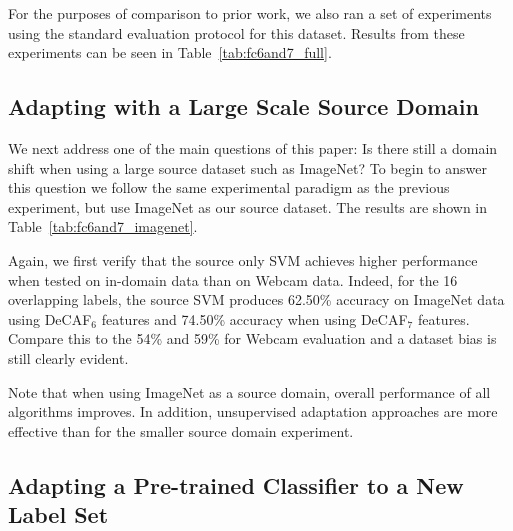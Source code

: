 


For the purposes of comparison to prior work, we also ran a set of experiments
using the standard evaluation protocol for this dataset.  Results from these experiments can be seen in
Table~\ref{tab:fc6and7_full}.


\subsection{Adapting with a Large Scale Source Domain}

We next address one of the main questions of this paper: Is there still a domain shift when using a large source dataset such as ImageNet? To begin to answer this question we follow the same experimental paradigm as the previous experiment, but use ImageNet as our source dataset. 
The results are shown in Table~\ref{tab:fc6and7_imagenet}. %



Again, we first verify that the source only SVM achieves higher performance when tested on in-domain data than on Webcam data. 
Indeed, for the 16 overlapping labels, the source SVM produces 62.50\% accuracy on ImageNet data using DeCAF$_6$ features and 74.50\% accuracy when using DeCAF$_7$ features. 
Compare this to the 54\% and 59\% for Webcam evaluation and a dataset bias is still clearly evident.

Note that when using ImageNet as a source domain, overall performance of all algorithms improves. In addition, unsupervised adaptation approaches are more effective than for the smaller source domain experiment. 



\subsection{Adapting a Pre-trained Classifier to a New Label Set }



